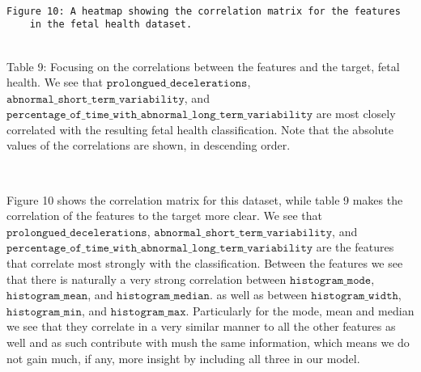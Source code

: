 \documentclass[11pt]{article}
\begin{document}
    \begin{center}
    \end{center}
    { \hspace*{\fill} \\}

 \begin{Verbatim}[commandchars=\\\{\}]
 	Figure 10: A heatmap showing the correlation matrix for the features 
 	in the fetal health dataset.
 \end{Verbatim}
 

 \hspace*{\fill} \\
Table 9: Focusing on the correlations between the features and the target, 
fetal health. We see that $\texttt{prolongued\_decelerations}$, 
$\texttt{abnormal\_short\_term\_variability}$, and 
$\texttt{percentage\_of\_time\_with\_abnormal\_long\_term\_variability}$ are most closely 
correlated with the resulting fetal health classification. Note that the absolute 
values of the correlations are shown, in descending order.

    \begin{center}
\end{center}
{ \hspace*{\fill} \\}
        
    Figure 10 shows the correlation matrix for this dataset, while table
9 makes the correlation of the features to the target more clear.
We see that \(\texttt{prolongued\_decelerations}\),
\(\texttt{abnormal\_short\_term\_variability}\), and
\(\texttt{percentage\_of\_time\_with\_abnormal\_long\_term\_variability}\) are
the features that correlate most strongly with the classification. Between the features we see that there is naturally a
very strong correlation between \(\texttt{histogram\_mode}\),
\(\texttt{histogram\_mean}\), and \(\texttt{histogram\_median}\). as well
as between \(\texttt{histogram\_width}\), \(\texttt{histogram\_min}\), and
\(\texttt{histogram\_max}\). Particularly for the mode, mean and median
we see that they correlate in a very similar manner to all the other
features as well and as such contribute with mush the same information,
which means we do not gain much, if any, more insight by including all
three in our model.
\end{document}
